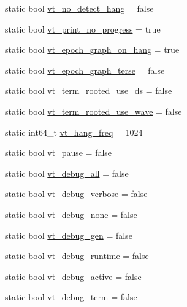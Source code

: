 \begin{DoxyCompactItemize}
static bool \hyperlink{structvt_1_1arguments_1_1_arg_config_a567d431e527d7a77c2bbddb4c52b781e}{vt\+\_\+no\+\_\+detect\+\_\+hang} = false
\item 
static bool \hyperlink{structvt_1_1arguments_1_1_arg_config_a6bbdd118f6e731cd446afb5e33af11bf}{vt\+\_\+print\+\_\+no\+\_\+progress} = true
\item 
static bool \hyperlink{structvt_1_1arguments_1_1_arg_config_ac691ea78d2c3079f3600f053f4fffa11}{vt\+\_\+epoch\+\_\+graph\+\_\+on\+\_\+hang} = true
\item 
static bool \hyperlink{structvt_1_1arguments_1_1_arg_config_a86447854a05bfbe2223a2e5a3561e78f}{vt\+\_\+epoch\+\_\+graph\+\_\+terse} = false
\item 
static bool \hyperlink{structvt_1_1arguments_1_1_arg_config_a7fad2709c0787c6ae775a83680ad9914}{vt\+\_\+term\+\_\+rooted\+\_\+use\+\_\+ds} = false
\item 
static bool \hyperlink{structvt_1_1arguments_1_1_arg_config_a1bd318b03ae9b5e87c2c7f2cde4a2a72}{vt\+\_\+term\+\_\+rooted\+\_\+use\+\_\+wave} = false
\item 
static int64\+\_\+t \hyperlink{structvt_1_1arguments_1_1_arg_config_a8bcbaf567f64aac567993c064179a5e5}{vt\+\_\+hang\+\_\+freq} = 1024
\item 
static bool \hyperlink{structvt_1_1arguments_1_1_arg_config_a46f31e594725bd599f66b0a0682162bc}{vt\+\_\+pause} = false
\item 
static bool \hyperlink{structvt_1_1arguments_1_1_arg_config_a2bad2770bdb9bfb9bb8f9cd6cd9ae492}{vt\+\_\+debug\+\_\+all} = false
\item 
static bool \hyperlink{structvt_1_1arguments_1_1_arg_config_ad863fc3da4d2e0e3ce0b36647da8e29b}{vt\+\_\+debug\+\_\+verbose} = false
\item 
static bool \hyperlink{structvt_1_1arguments_1_1_arg_config_ad8244f0e0ba0f2b2cbf2bc5f58acc5b0}{vt\+\_\+debug\+\_\+none} = false
\item 
static bool \hyperlink{structvt_1_1arguments_1_1_arg_config_a6c897d45359f0cae8d31f3817bbb9b60}{vt\+\_\+debug\+\_\+gen} = false
\item 
static bool \hyperlink{structvt_1_1arguments_1_1_arg_config_ae09f0220544451872310ed5188b98d9b}{vt\+\_\+debug\+\_\+runtime} = false
\item 
static bool \hyperlink{structvt_1_1arguments_1_1_arg_config_aa40cb6ebcb449382ec1da2d73855de1f}{vt\+\_\+debug\+\_\+active} = false
\item 
static bool \hyperlink{structvt_1_1arguments_1_1_arg_config_aff950c7950ea868ccc78769a9a9ccf45}{vt\+\_\+debug\+\_\+term} = false

\end{DoxyCompactItemize}
